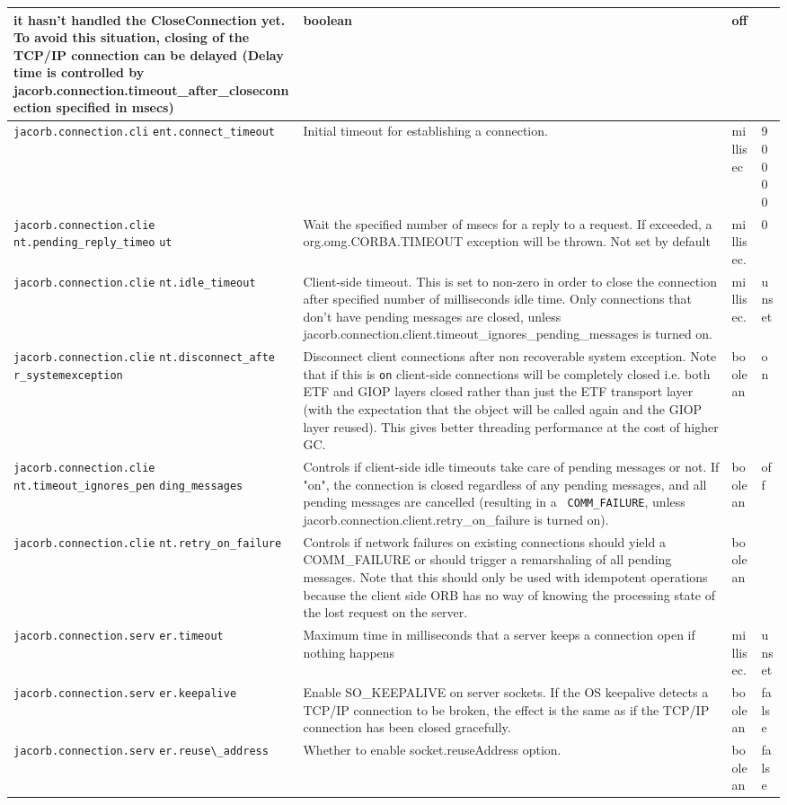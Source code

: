 \begin{small}
\begin{longtable}{|p{5cm}|p{7.5cm}|p{1.5cm}|p{1.5cm}|}
it hasn't handled the CloseConnection yet. To avoid this situation, closing
of the TCP/IP connection can be delayed (Delay time is controlled by
jacorb.connection.timeout\_after\_closeconnection specified in msecs) &
boolean & off \\
\hline
\verb"jacorb.connection.cli"
\verb"ent.connect_timeout" & Initial timeout for establishing a connection.
 & millisec & 90000 \\
\hline
\verb"jacorb.connection.clie"
\verb"nt.pending_reply_timeo"
\verb"ut" &  Wait the specified number of msecs for a reply to a
request. If exceeded, a org.omg.CORBA.TIMEOUT exception will be
thrown. Not set by default & millisec. & 0  \\
\hline
\verb"jacorb.connection.clie"
\verb"nt.idle_timeout" & Client-side timeout. This is set to non-zero in order
to close the connection after specified number of milliseconds idle time. Only
connections that don't have pending messages are closed, unless
jacorb.connection.client.timeout\_ignores\_pending\_messages is turned on. &
millisec. & unset \\
\hline
\verb"jacorb.connection.clie"
\verb"nt.disconnect_afte"
\verb"r_systemexception" & Disconnect client connections after non recoverable system
exception. Note that if this is {\tt on} client-side connections will be
completely closed i.e. both ETF and GIOP layers closed rather than just the ETF
transport layer (with the expectation that the object will be called again and
the GIOP layer reused). This gives better threading performance at the cost of
higher GC. & boolean & on \\

\hline
\verb"jacorb.connection.clie"
\verb"nt.timeout_ignores_pen"
\verb"ding_messages" & Controls if client-side idle timeouts take care of
pending messages or not. If "on", the connection is closed regardless of any
pending messages, and all pending messages are cancelled (resulting in a {\tt
COMM\_FAILURE}, unless jacorb.connection.client.retry\_on\_failure is turned
on).& boolean & off \\
\hline
\verb"jacorb.connection.clie"
\verb"nt.retry_on_failure" & Controls if network failures on existing connections
should yield a COMM\_FAILURE or should trigger a remarshaling
of all pending messages. Note that this should only be used with idempotent
operations because the client side ORB has no way of knowing the processing
state of the lost request on the server. & boolean & \\
\hline
\verb"jacorb.connection.serv"
\verb"er.timeout" & Maximum time in milliseconds that a server keeps a
connection open if nothing happens & millisec. & unset \\
\hline
\verb"jacorb.connection.serv"
\verb"er.keepalive" & Enable SO\_KEEPALIVE on server sockets. If the OS
keepalive detects a TCP/IP connection to be broken, the effect is the same as
if the TCP/IP connection has been closed gracefully. & boolean & false \\
\verb"jacorb.connection.serv"
\verb"er.reuse\_address" & Whether to enable socket.reuseAddress option. & boolean &
false \\
\hline


\end{longtable}
\end{small}
